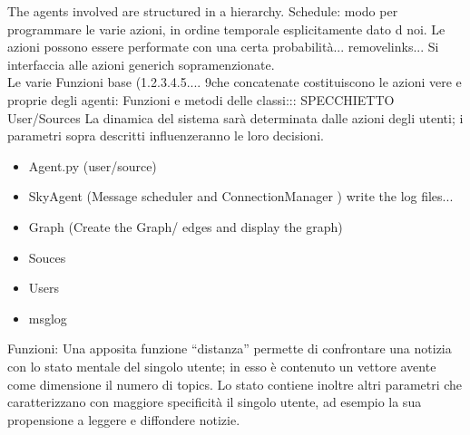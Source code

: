 The agents involved are structured in a hierarchy. 
Schedule: modo per programmare le varie azioni, in ordine temporale esplicitamente dato d noi.  Le azioni possono essere performate con una certa probabilità... removelinks...
Si interfaccia alle azioni generich sopramenzionate.
\\
Le varie Funzioni base (1.2.3.4.5....  9che concatenate costituiscono le azioni vere e proprie degli agenti: Funzioni e metodi delle classi::: SPECCHIETTO
User/Sources
La dinamica del sistema sarà determinata dalle azioni degli utenti; i parametri sopra descritti
influenzeranno le loro decisioni.
\begin{itemize}
\item Agent.py   (user/source) 
\item SkyAgent  (Message scheduler and ConnectionManager ) write the log files...
\item Graph (Create the Graph/ edges and display the graph)
\item Souces
\item Users

\item msglog
\end{itemize}
Funzioni:
Una apposita funzione “distanza” permette di confrontare una notizia con lo stato mentale del
singolo utente; in esso è contenuto un vettore avente come dimensione il numero di topics. Lo stato
contiene inoltre altri parametri che caratterizzano con maggiore specificità il singolo utente, ad
esempio la sua propensione a leggere e diffondere notizie.
